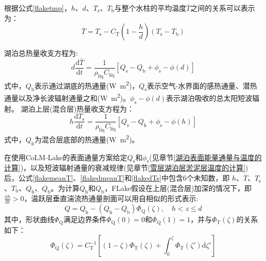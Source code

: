 根据公式\eqref{flaketmp}，$h$、$d$、$T_{\mathrm{s}}$、$T_{\mathrm{b}}$与整个水柱的平均温度$\overline{T}$之间的关系可以表示为：
\begin{equation}\label{flakemeanT}
    \overline{T} = T_{\mathrm{s}} - C_{\mathrm{T}} \left( 1 - \frac{h}{d} \right) \left( T_{\mathrm{s}} - T_{\mathrm{b}} \right)
\end{equation}

湖泊总热量收支方程为:
\begin{equation}\label{flakedmeanT}
    d \frac{\mathrm{d} \overline{T}}{\mathrm{d}t} = \frac{1}{\rho_{\mathrm{liq}} C_{\mathrm{liq}}} \left[ Q_{\mathrm{s}} - Q_{\mathrm{b}} + \phi_{\mathrm{s}} - \phi(d) \right]
\end{equation}
式中，$Q_{\mathrm{b}}$表示通过湖底的热通量(\unit{W.m^{2}})，$Q_{\mathrm{s}}$表示空气-水界面的感热通量、潜热通量以及净长波辐射通量之和(\unit{W.m^{2}})。$\phi_{\mathrm{s}} - \phi(d)$表示湖泊吸收的总太阳短波辐射。
湖泊上层(混合层)热量收支方程为：
\begin{equation}\label{flakedTs}
    h \frac{\mathrm{d} T_{\mathrm{s}}}{\mathrm{d}t} = \frac{1}{\rho_{\mathrm{liq}} C_{\mathrm{liq}}} \left[ Q_{\mathrm{s}} - Q_{\mathrm{h}} + \phi_{\mathrm{s}} - \phi \left( h \right) \right]
\end{equation}
式中，$Q_{\mathrm{h}}$为混合层底部的热通量(\unit{W.m^{2}})。

在使用CoLM-Lake的表面通量方案给定$Q_{\mathrm{s}}$和$\phi_{\mathrm{s}}$(见章节\ref{湖泊表面能量通量与温度的计算})，以及短波辐射通量的衰减规律(见章节\ref{雪层湖泊层淤泥层温度的计算})后，公式\eqref{flakemeanT}、\eqref{flakedmeanT}和\eqref{flakedTs}中包含6个未知数，即 $h$、$\overline{T}$、$T_{\mathrm{s}}$、$T_{\mathrm{b}}$、$Q_{\mathrm{h}}$、$Q_{\mathrm{b}}$。为计算$Q_{\mathrm{h}}$和$Q_{\mathrm{b}}$，FLake假设在上层(混合层)加深的情况下，即$\frac{\mathrm{d} h}{\mathrm{d} t} > 0$，温跃层垂直湍流热通量剖面可以用自相似的形式表示:
\begin{equation}\label{flakeQ}
    Q = Q_{\mathrm{h}} - (Q_{\mathrm{h}} - Q_{\mathrm{b}}) \Phi_{\mathrm{Q}} (\zeta), \quad h < z \leq d
\end{equation}
其中，形状曲线$\Phi_{\mathrm{Q}}$满足边界条件$\Phi_{\mathrm{Q}}(0) = 0$和$\Phi_{\mathrm{Q}}(1) = 1$，并与$\Phi_{\mathrm{T}}(\zeta)$的关系如下：
\begin{equation}
    \Phi_{\mathrm{Q}}(\zeta) = C_{\mathrm{T}} ^ {\mathrm{-1}} \left[ \left( 1 - \zeta \right) \Phi_{\mathrm{T}}(\zeta) + \int_{\mathrm{0}} ^ {\zeta} \Phi_{\mathrm{T}}(\zeta') \mathrm{d} \zeta' \right]
\end{equation}

